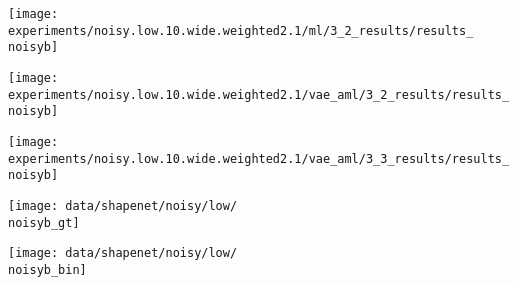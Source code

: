 {\begin{minipage}[t]{0.10\textwidth}
    \vspace{0px}\centering
    \texttt{[image: experiments/noisy.low.10.wide.weighted2.1/ml/3\_2\_results/results\_\\noisyb]}
\end{minipage}
\begin{minipage}[t]{0.10\textwidth}
   	\vspace{0px}\centering
   	\texttt{[image: experiments/noisy.low.10.wide.weighted2.1/vae\_aml/3\_2\_results/results\_\\noisyb]}
\end{minipage}
\begin{minipage}[t]{0.10\textwidth}
   	\vspace{0px}\centering
   	\texttt{[image: experiments/noisy.low.10.wide.weighted2.1/vae\_aml/3\_3\_results/results\_\\noisyb]}
\end{minipage}
\begin{minipage}[t]{0.10\textwidth}
   	\vspace{0px}\centering
   	\texttt{[image: data/shapenet/noisy/low/\\noisyb\_gt]}
\end{minipage}
\begin{minipage}[t]{0.10\textwidth}
   	\vspace{0px}\centering
   	\texttt{[image: data/shapenet/noisy/low/\\noisyb\_bin]}
\end{minipage}
\\[3mm]
\hspace*{-6px}
\begin{minipage}[t]{0.02\textwidth}
    \vspace{0px}\centering

\end{minipage}}
